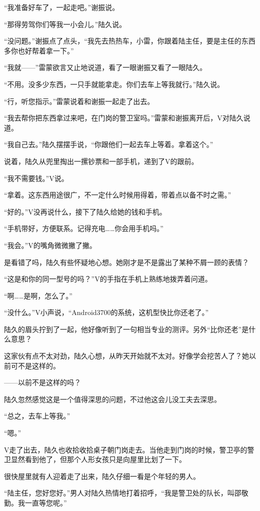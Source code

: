 “我准备好车了，一起走吧。”谢振说。

“那得劳驾你们等我一小会儿。”陆久说。

“没问题。”谢振点了点头，“我先去热热车，小雷，你跟着陆主任，要是主任的东西多你也好帮着拿一下。”

“我就——”雷蒙欲言又止地说道，看了一眼谢振又看了一眼陆久。

“不用。没多少东西，一只手就能拿走。你们去车上等我就行。”陆久说。

“行，听您指示。”雷蒙说着和谢振一起走了出去。

“我去帮你把东西拿过来吧，在门岗的警卫室吗。”雷蒙和谢振离开后，V对陆久说道。

“我自己去。”陆久摆摆手说，“你跟他们一起去车上等着。拿着这个。”

说着，陆久从兜里掏出一摞钞票和一部手机，递到了V的跟前。

“我不需要钱。”V说。

“拿着。这东西用途很广，不一定什么时候用得着，带着点以备不时之需。”

“好的。”V没再说什么，接下了陆久给她的钱和手机。

“手机带好，方便联系。记得充电……你会用手机吗。”

“我会。”V的嘴角微微撇了撇。

是看错了吗，陆久有些怀疑地心想。她刚才是不是露出了某种不屑一顾的表情？

“这是和你的同一型号的吗？”V的手指在手机上熟练地拨弄着问道。

“啊……是啊，怎么了。”

“没什么。”V小声说，“Android3700的系统，这机型快比你还老了。”

陆久的眉头拧到了一起，他好像听到了一句相当专业的测评。另外“比你还老”是什么意思？

这家伙有点不太对劲，陆久心想，从昨天开始就不太对。好像学会挖苦人了？她以前可不是这样的。

——以前不是这样的吗？

陆久忽然感觉这是一个值得深思的问题，不过他这会儿没工夫去深思。

“总之，去车上等我。”

“嗯。”

V走了出去，陆久也收拾收拾桌子朝门岗走去。当他走到门岗的时候，警卫亭的警卫显然看到他了，但那个人形女孩只是向屋里比划了一下。

很快屋里就有人迎着走了出来，陆久仔细一看是个年轻的男人。

“陆主任，您好您好。”男人对陆久热情地打着招呼，“我是警卫处的队长，叫邵敬勤。我一直等您呢。”

